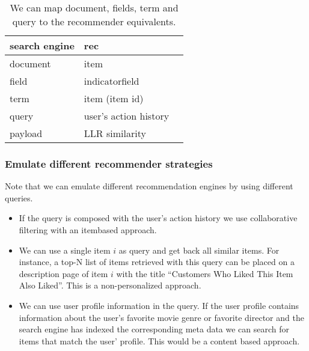 \begin{table}
\begin{center}
\begin{tabular}{lll}
 search engine & \gls{rec}\\ \hline
  document & item\\ 
 field & indicatorfield \\
 term & item (item id)    \\
 query & user's action history \\
payload & LLR similarity \\
\end{tabular}
\end{center}
\caption{We can map document, fields, term and query to the recommender equivalents.}
\label{tbl:comparison}
\end{table}

\subsubsection{Emulate different recommender strategies}

Note that we can emulate different recommendation engines by using different queries.
\begin{itemize}
\item If the query is composed with the user's action history we use collaborative filtering with an \gls{itembased} approach.
\item We can use a single item $i$ as query and get back all similar items. For instance, a top-N list of items retrieved with this query can be placed on a description page of item $i$ with the title ``Customers Who Liked This Item Also Liked''. This is a non-personalized approach.
\item We can use user profile information in the query. If the user profile contains information about the user's favorite movie genre or favorite director and the search engine has indexed the corresponding meta data we can search for items that match the user' profile. This would be a content based approach.
\end{itemize}

